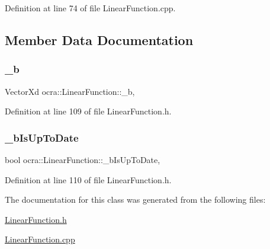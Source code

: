 Definition at line 74 of file Linear\+Function.\+cpp.



\subsection{Member Data Documentation}
\hypertarget{classocra_1_1LinearFunction_ab556d7683de415e8273bdbf955f7da02}{}\label{classocra_1_1LinearFunction_ab556d7683de415e8273bdbf955f7da02} 
\subsubsection{\texorpdfstring{\+\_\+b}{\_b}}
{\footnotesize\ttfamily Vector\+Xd ocra\+::\+Linear\+Function\+::\+\_\+b\hspace{0.3cm}{\ttfamily [mutable]}, {\ttfamily [protected]}}



Definition at line 109 of file Linear\+Function.\+h.

\hypertarget{classocra_1_1LinearFunction_a97de5274c98711b37b04aed99c237ce6}{}\label{classocra_1_1LinearFunction_a97de5274c98711b37b04aed99c237ce6} 
\subsubsection{\texorpdfstring{\+\_\+b\+Is\+Up\+To\+Date}{\_bIsUpToDate}}
{\footnotesize\ttfamily bool ocra\+::\+Linear\+Function\+::\+\_\+b\+Is\+Up\+To\+Date\hspace{0.3cm}{\ttfamily [mutable]}, {\ttfamily [protected]}}



Definition at line 110 of file Linear\+Function.\+h.



The documentation for this class was generated from the following files\+:\begin{DoxyCompactItemize}
\item 
\hyperlink{LinearFunction_8h}{Linear\+Function.\+h}\item 
\hyperlink{LinearFunction_8cpp}{Linear\+Function.\+cpp}\end{DoxyCompactItemize}
